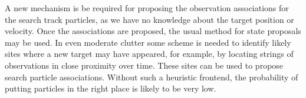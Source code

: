 A new mechanism is be required for proposing the observation associations for the search track particles, as we have no knowledge about the target position or velocity. Once the associations are proposed, the usual method for state proposals may be used. In even moderate clutter some scheme is needed to identify likely sites where a new target may have appeared, for example, by locating strings of observations in close proximity over time. These sites can be used to propose search particle associations. Without such a heuristic frontend, the probability of putting particles in the right place is likely to be very low.